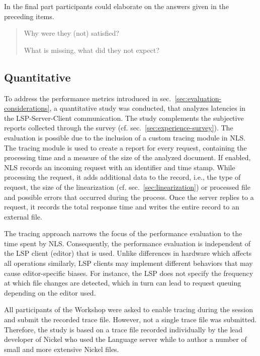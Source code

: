 \documentclass[
  a4paper,
  bibtex,
  english,
  nomenclature]{kthlatex/kththesis/kththesis}
\begin{document}
In the final part participants could elaborate on the answers given in
the preceding items.

\begin{quote}
Why were they (not) satisfied?

What is missing, what did they not expect?
\end{quote}

\hypertarget{sec:quantitative-methods}{%
\subsection{Quantitative}\label{sec:quantitative-methods}}

To address the performance metrics introduced in
sec.~\ref{sec:evaluation-considerations}, a quantitative study was
conducted, that analyzes latencies in the LSP-Server-Client
communication. The study complements the subjective reports collected
through the survey (cf. sec.~\ref{sec:experience-survey}). The
evaluation is possible due to the inclusion of a custom tracing module
in NLS. The tracing module is used to create a report for every request,
containing the processing time and a measure of the size of the analyzed
document. If enabled, NLS records an incoming request with an identifier
and time stamp. While processing the request, it adds additional data to
the record, i.e., the type of request, the size of the linearization
(cf. sec.~\ref{sec:linearization}) or processed file and possible errors
that occurred during the process. Once the server replies to a request,
it records the total response time and writes the entire record to an
external file.

The tracing approach narrows the focus of the performance evaluation to
the time spent by NLS. Consequently, the performance evaluation is
independent of the LSP client (editor) that is used. Unlike differences
in hardware which affects all operations similarly, LSP clients may
implement different behaviors that may cause editor-specific biases. For
instance, the LSP does not specify the frequency at which file changes
are detected, which in turn can lead to request queuing depending on the
editor used.

All participants of the Workshop were asked to enable tracing during the
session and submit the recorded trace file. However, not a single trace
file was submitted. Therefore, the study is based on a trace file
recorded individually by the lead developer of Nickel who used the
Language server while to author a number of small and more extensive
Nickel files.
\end{document}
